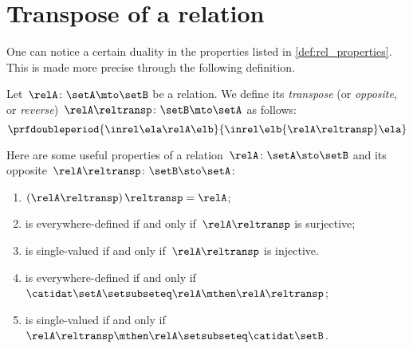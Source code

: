 
\section{Transpose of a relation}

One can notice a certain duality in the properties listed in \cref{def:rel_properties}.
This is made more precise through the following definition.

\begin{ctdefinition}
    \label{def:relation-transpose}
    Let~$\relA\colon \setA\mto \setB$ be a relation.
    We define its \emph{transpose} (or \emph{opposite}, or \emph{reverse})~$\relA\reltransp\colon \setB \mto \setA$ as follows:
    \begin{equation}
        \prfdoubleperiod{
            \inrel \ela \relA \elb
        }{
            \inrel \elb {\relA\reltransp} \ela
        }
    \end{equation}
\end{ctdefinition}
\begin{remark}
    \label{re:rel-op-properties}
    Here are some useful properties of a relation~$\relA\colon \setA \sto \setB$  and its opposite~$\relA\reltransp\colon \setB \sto \setA$:
    \begin{enumerate}
        \item $\left(\relA\reltransp\right)\reltransp = \relA $;
        \item \relA is everywhere-defined if and only if~$\relA\reltransp$ is surjective;
        \item \relA is single-valued if and only if~$\relA\reltransp$ is injective.
        \item \relA is everywhere-defined if and only if~$\catidat\setA\setsubseteq \relA \mthen \relA\reltransp$;
        \item \relA is single-valued if and only if~$\relA\reltransp\mthen \relA\setsubseteq \catidat\setB$.
    \end{enumerate}
\end{remark}

\begin{marginfigure}
    \centering
    \caption{}
    \label{fig:rel_transpose}
\end{marginfigure}

